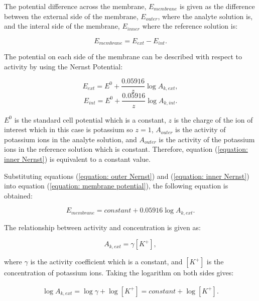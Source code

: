 The potential difference across the membrane, $E_{membrane}$ is given as the difference between the external side of the membrane, $E_{outer}$, where the analyte solution is, and the interal side of the membrane, $E_{inner}$ where the reference solution is:

\begin{equation}
    E_{membrane} = E_{ext} - E_{int}.
    \label{equation: membrane potential}
\end{equation}

The potential on each side of the membrane can be described with respect to activity by using the Nernst Potential:

\begin{equation}
    E_{ext} = E^{0} + \frac{0.05916}{z}\log A_{k,ext}, 
    \label{equation: outer Nernst} 
\end{equation}
\begin{equation}
    E_{int} = E^{0} + \frac{0.05916}{z}\log A_{k,int}.
    \label{equation: inner Nernst}
\end{equation}

\noindent $E^{0}$ is the standard cell potential which is a constant, $z$ is the charge of the ion of interest which in this case is potassium so $z=1$, $A_{outer}$ is the activity of potassium ions in the analyte solution, and $A_{outer}$ is the activity of the potassium ions in the reference solution which is constant. Therefore, equation (\ref{equation: inner Nernst}) is equivalent to a constant value.

Substituting equations (\ref{equation: outer Nernst}) and (\ref{equation: inner Nernst}) into equation (\ref{equation: membrane potential}), the following equation is obtained:

\begin{equation}
    E_{membrane} = constant + 0.05916\log A_{k,ext}.
    \label{equation: membrane potential 2}
\end{equation}

The relationship between activity and concentration is given as:

\begin{equation}
    A_{k,ext} = \gamma [K^{+}],
    \label{equation: activity}
\end{equation}

\noindent where $\gamma$ is the activity coefficient which is a constant, and $[K^{+}]$ is the concentration of potassium ions. Taking the logarithm on both sides gives:

\begin{align}
    \log A_{k,ext} = \log\gamma + \log [K^{+}] = constant + \log [K^{+}].
    \label{equation: log activity}
\end{align}

